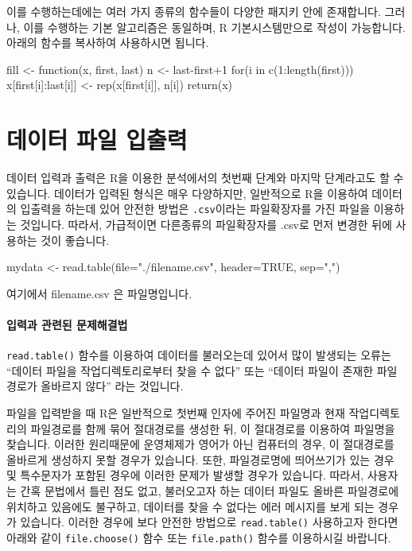 이를 수행하는데에는 여러 가지 종류의 함수들이 다양한 패지키 안에 존재합니다.  
그러나, 이를 수행하는 기본 알고리즘은 동일하며, R 기본시스템만으로 작성이 가능합니다. 
아래의 함수를 복사하여 사용하시면 됩니다. 

\begin{Schunk}
	\begin{Soutput}
fill <- function(x, first, last){
	n <- last-first+1
	for(i in c(1:length(first))) x[first[i]:last[i]] <- rep(x[first[i]], n[i])
	return(x)
}
	\end{Soutput}
\end{Schunk}




%
%
%
%

\section{데이터 파일 입출력}

데이터 입력과 출력은 R을 이용한 분석에서의 첫번째 단계와 마지막 단계라고도 할 수 있습니다. 
데이터가 입력된 형식은 매우 다양하지만,  일반적으로 R을 이용하여 데이터의 입출력을 하는데 있어 안전한 방법은 \texttt{.csv}이라는 파일확장자를 가진 파일을 이용하는 것입니다.
따라서, 가급적이면 다른종류의 파일확장자를 .csv로 먼저 변경한 뒤에 사용하는 것이 좋습니다. 

\begin{Schunk}
\begin{Soutput}
mydata <- read.table(file="./filename.csv", header=TRUE, sep=",")
\end{Soutput}
\end{Schunk}

여기에서 filename.csv 은 파일명입니다.

\paragraph{입력과 관련된 문제해결법}

\texttt{read.table()} 함수를 이용하여 데이터를 불러오는데 있어서 많이 발생되는 오류는 ``데이터 파일을 작업디렉토리로부터 찾을 수 없다'' 또는 ``데이터 파일이 존재한 파일경로가 올바르지 않다'' 라는 것입니다. 

파일을 입력받을 때 R은 일반적으로 첫번째 인자에 주어진 파일명과 현재 작업디렉토리의 파일경로를 함께 묶어 절대경로를 생성한 뒤, 이 절대경로를 이용하여 파일명을 찾습니다. 
이러한 원리때문에 운영체제가 영어가 아닌 컴퓨터의 경우, 이 절대경로를 올바르게 생성하지 못할 경우가 있습니다. 
또한, 파일경로명에 띄어쓰기가 있는 경우 및 특수문자가 포함된 경우에 이러한 문제가 발생할 경우가 있습니다. 
따라서, 사용자는 간혹 문법에서 틀린 점도 없고, 불러오고자 하는 데이터 파일도 올바른 파일경로에 위치하고 있음에도 불구하고, 데이터를 찾을 수 없다는 에러 메시지를 보게 되는 경우가 있습니다. 
이러한 경우에 보다 안전한 방법으로 \texttt{read.table()} 사용하고자 한다면 아래와 같이 \texttt{file.choose()} 함수 또는 \texttt{file.path()} 함수를 이용하시길 바랍니다.

